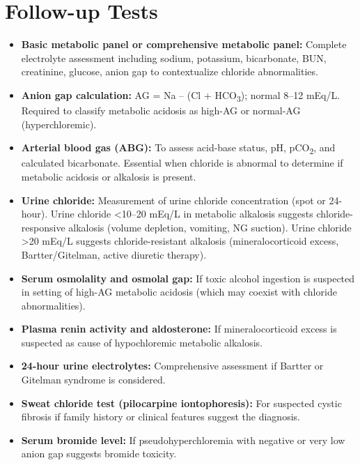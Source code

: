 \section*{Follow-up Tests}
\begin{itemize}
  \item \textbf{Basic metabolic panel or comprehensive metabolic panel:} Complete electrolyte assessment including sodium, potassium, bicarbonate, BUN, creatinine, glucose, anion gap to contextualize chloride abnormalities.
  \item \textbf{Anion gap calculation:} AG = Na -- (Cl + HCO\textsubscript{3}); normal 8--12 mEq/L. Required to classify metabolic acidosis as high-AG or normal-AG (hyperchloremic).
  \item \textbf{Arterial blood gas (ABG):} To assess acid-base status, pH, pCO\textsubscript{2}, and calculated bicarbonate. Essential when chloride is abnormal to determine if metabolic acidosis or alkalosis is present.
  \item \textbf{Urine chloride:} Measurement of urine chloride concentration (spot or 24-hour). Urine chloride <10--20 mEq/L in metabolic alkalosis suggests chloride-responsive alkalosis (volume depletion, vomiting, NG suction). Urine chloride >20 mEq/L suggests chloride-resistant alkalosis (mineralocorticoid excess, Bartter/Gitelman, active diuretic therapy).
  \item \textbf{Serum osmolality and osmolal gap:} If toxic alcohol ingestion is suspected in setting of high-AG metabolic acidosis (which may coexist with chloride abnormalities).
  \item \textbf{Plasma renin activity and aldosterone:} If mineralocorticoid excess is suspected as cause of hypochloremic metabolic alkalosis.
  \item \textbf{24-hour urine electrolytes:} Comprehensive assessment if Bartter or Gitelman syndrome is considered.
  \item \textbf{Sweat chloride test (pilocarpine iontophoresis):} For suspected cystic fibrosis if family history or clinical features suggest the diagnosis.
  \item \textbf{Serum bromide level:} If pseudohyperchloremia with negative or very low anion gap suggests bromide toxicity.
\end{itemize}

